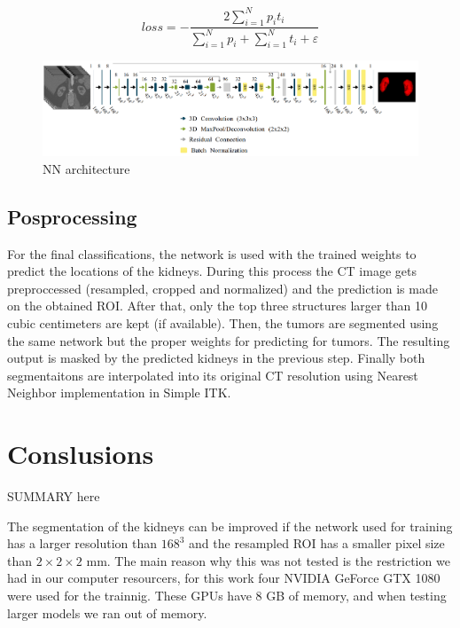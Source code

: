 \documentclass{article}
\begin{document}
\begin{equation}
    loss = - \frac{2 \sum_{i=1}^{N}p_it_i}{\sum_{i=1}^{N}p_i + \sum_{i=1}^{N}t_i + \varepsilon}
    \label{eq:dsc}
\end{equation}

\begin{figure}[h]
    \centering
    \includegraphics[totalheight=.18\textheight]{imgs/nn.png}
    \caption{NN architecture }
    \label{fig:arc}
\end{figure}


\subsection{Posprocessing}
\label{sec:post}
For the final classifications, the network is used with the trained weights to predict the locations of the kidneys. During this process the CT image gets preproccessed (resampled, cropped and normalized) and the prediction is made on the obtained ROI.
After that, only the top three structures  larger than 10 cubic centimeters are kept (if available). Then, the tumors
are segmented using the same network but the proper weights for predicting for tumors. The resulting output is masked
by the predicted kidneys in the previous step. Finally both segmentaitons are interpolated into its original CT resolution using Nearest Neighbor implementation in Simple ITK. 

\section{Conslusions}
\label{sec:conlusions}
SUMMARY here

The segmentation of the kidneys can be improved if the network used for training has a larger resolution than $168^3$
and the resampled ROI has a smaller pixel size than $2 \times 2 \times 2$ mm. The main reason why this was not tested
is the restriction we had in our computer resourcers, for this work four NVIDIA GeForce GTX 1080 were used for the trainnig.
These GPUs have 8 GB of memory, and when testing larger models we ran out of memory. 

\printbibliography
\end{document}
